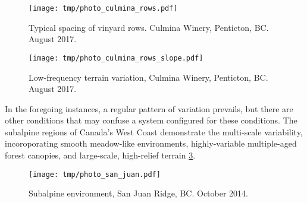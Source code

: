 \begin{figure} %
\texttt{[image: tmp/photo\_culmina\_rows.pdf]} 
\caption{Typical spacing of vinyard rows. Culmina Winery, Penticton, BC. August 2017.}
\label{fig:photo_culmina_rows}
\end{figure}

\begin{figure} %
\texttt{[image: tmp/photo\_culmina\_rows\_slope.pdf]} 
\caption{Low-frequency terrain variation, Culmina Winery, Penticton, BC. August 2017.}
\label{fig:photo_culmina_rows_slope}
\end{figure}

In the foregoing instances, a regular pattern of variation prevails, but there are other conditions that may confuse a system configured for these conditions. The subalpine regions of Canada's West Coast demonstrate the multi-scale variability, incoroporating smooth meadow-like environments, highly-variable multiple-aged forest canopies, and large-scale, high-relief terrain \ref{fig:photo_san_juan}.

\begin{figure} %
\begin{center}
\texttt{[image: tmp/photo\_san\_juan.pdf]} 
\end{center}
\caption{Subalpine environment, San Juan Ridge, BC. October 2014.}
\label{fig:photo_san_juan}
\end{figure}

